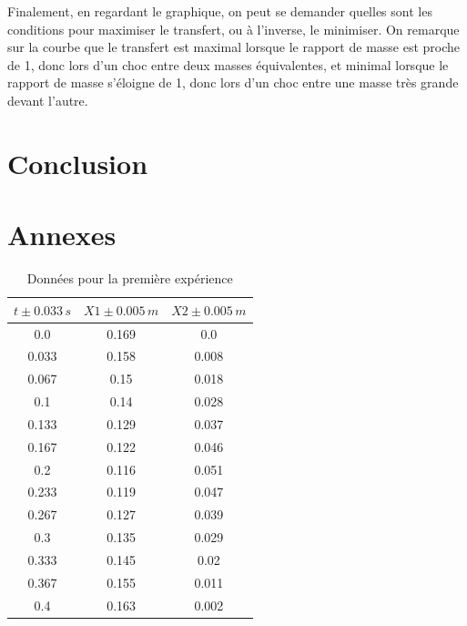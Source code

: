 \documentclass[12pt]{article}
\begin{document}
Finalement, en regardant le graphique, on peut se demander quelles sont les conditions pour maximiser le transfert, ou à l'inverse, le minimiser. On remarque sur la courbe que le transfert est maximal lorsque
le rapport de masse est proche de 1, donc lors d'un choc entre deux masses équivalentes, et minimal lorsque le rapport de masse s'éloigne de 1, donc lors d'un choc entre une masse très grande devant l'autre.

\section*{Conclusion}


\newpage
\section*{Annexes}
\begin{table}[h!]
	\begin{center}
		\begin{tabular}{|c|c|c|}
		\hline
		$t\pm 0.033\, s$ & $X1\pm 0.005\, m$ & $X2\pm 0.005\, m$\\
		\hline
		0.0 & 0.169 & 0.0 \\ 
0.033 & 0.158 & 0.008 \\ 
0.067 & 0.15 & 0.018 \\ 
0.1 & 0.14 & 0.028 \\ 
0.133 & 0.129 & 0.037 \\ 
0.167 & 0.122 & 0.046 \\ 
0.2 & 0.116 & 0.051 \\ 
0.233 & 0.119 & 0.047 \\ 
0.267 & 0.127 & 0.039 \\ 
0.3 & 0.135 & 0.029 \\ 
0.333 & 0.145 & 0.02 \\ 
0.367 & 0.155 & 0.011 \\ 
0.4 & 0.163 & 0.002 \\ 	
\hline	
		\end{tabular}
		\label{Données1}
		\caption{Données pour la première expérience}
	\end{center}
\end{table}
\end{document}

